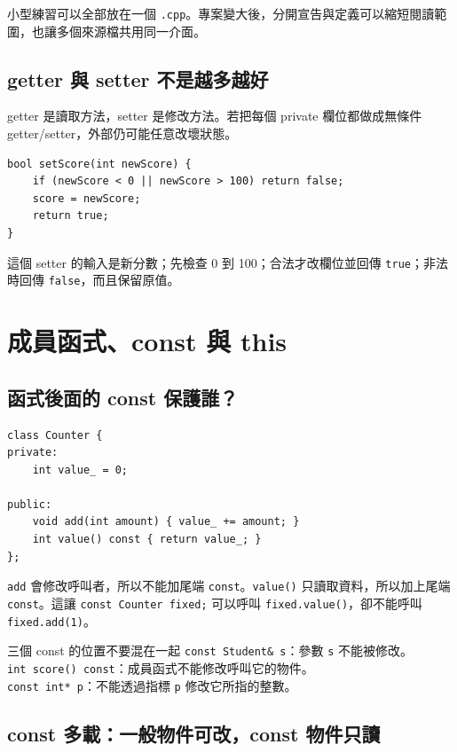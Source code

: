 \documentclass[11pt,a4paper]{article}
\newcommand{\code}[1]{\texttt{#1}}
\begin{document}
小型練習可以全部放在一個 \code{.cpp}。專案變大後，分開宣告與定義可以縮短閱讀範圍，也讓多個來源檔共用同一介面。

\subsection{getter 與 setter 不是越多越好}

getter 是讀取方法，setter 是修改方法。若把每個 private 欄位都做成無條件 getter/setter，外部仍可能任意改壞狀態。

\begin{lstlisting}
bool setScore(int newScore) {
    if (newScore < 0 || newScore > 100) return false;
    score = newScore;
    return true;
}
\end{lstlisting}

這個 setter 的輸入是新分數；先檢查 0 到 100；合法才改欄位並回傳 \code{true}；非法時回傳 \code{false}，而且保留原值。

\section{成員函式、const 與 this}

\subsection{函式後面的 const 保護誰？}

\begin{lstlisting}
class Counter {
private:
    int value_ = 0;

public:
    void add(int amount) { value_ += amount; }
    int value() const { return value_; }
};
\end{lstlisting}

\code{add} 會修改呼叫者，所以不能加尾端 \code{const}。\code{value()} 只讀取資料，所以加上尾端 \code{const}。這讓 \code{const Counter fixed;} 可以呼叫 \code{fixed.value()}，卻不能呼叫 \code{fixed.add(1)}。

\begin{warnbox}{三個 const 的位置不要混在一起}
\code{const Student\& s}：參數 \code{s} 不能被修改。\\
\code{int score() const}：成員函式不能修改呼叫它的物件。\\
\code{const int* p}：不能透過指標 \code{p} 修改它所指的整數。
\end{warnbox}

\subsection{const 多載：一般物件可改，const 物件只讀}
\end{document}
